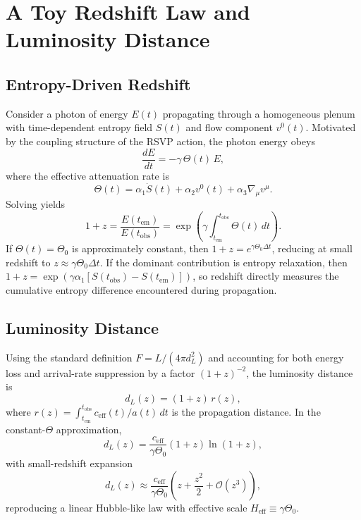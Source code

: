 \documentclass[12pt,a4paper]{article}
\theoremstyle{plain}
\theoremstyle{definition}
\theoremstyle{remark}
\begin{document}
\section{A Toy Redshift Law and Luminosity Distance}
\label{sec:redshift}

\subsection{Entropy-Driven Redshift}

Consider a photon of energy $E(t)$ propagating through a homogeneous
plenum with time-dependent entropy field $S(t)$ and flow component
$v^0(t)$. Motivated by the coupling structure of the RSVP action, the
photon energy obeys
\begin{equation}
\frac{dE}{dt} = -\gamma\,\Theta(t)\,E,
\end{equation}
where the effective attenuation rate is
\begin{equation}
\Theta(t) = \alpha_1\dot{S}(t) + \alpha_2 v^0(t) + \alpha_3\nabla_\mu v^\mu.
\end{equation}
Solving yields
\begin{equation}
1+z = \frac{E(t_{\mathrm{em}})}{E(t_{\mathrm{obs}})}
= \exp\!\left(\gamma\int_{t_{\mathrm{em}}}^{t_{\mathrm{obs}}}\Theta(t)\,dt\right).
\label{eq:toy-redshift}
\end{equation}
If $\Theta(t) = \Theta_0$ is approximately constant, then $1+z =
e^{\gamma\Theta_0\Delta t}$, reducing at small redshift to $z \approx
\gamma\Theta_0\Delta t$. If the dominant contribution is entropy
relaxation, then $1+z = \exp(\gamma\alpha_1[S(t_{\mathrm{obs}}) -
S(t_{\mathrm{em}})])$, so redshift directly measures the cumulative
entropy difference encountered during propagation.

\subsection{Luminosity Distance}

Using the standard definition $F = L/(4\pi d_L^2)$ and accounting for
both energy loss and arrival-rate suppression by a factor $(1+z)^{-2}$,
the luminosity distance is
\begin{equation}
d_L(z) = (1+z)\,r(z),
\end{equation}
where $r(z) = \int_{t_{\mathrm{em}}}^{t_{\mathrm{obs}}}
c_{\mathrm{eff}}(t)/a(t)\,dt$ is the propagation distance. In the
constant-$\Theta$ approximation,
\begin{equation}
d_L(z) = \frac{c_{\mathrm{eff}}}{\gamma\Theta_0}(1+z)\ln(1+z),
\label{eq:dl-log}
\end{equation}
with small-redshift expansion
\begin{equation}
d_L(z) \approx \frac{c_{\mathrm{eff}}}{\gamma\Theta_0}
\left(z + \frac{z^2}{2} + \mathcal{O}(z^3)\right),
\end{equation}
reproducing a linear Hubble-like law with effective scale $H_{\mathrm{eff}}
\equiv \gamma\Theta_0$.
\end{document}
